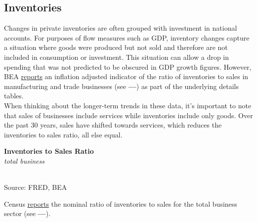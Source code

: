 \documentclass{report}
\makeatletter
\newcommand{\tbllink}[1]{\href{https://raw.githubusercontent.com/bdecon/US-chartbook/master/chartbook/data/#1}{\faTable}}
\newcommand*\short[1]{\expandafter\@gobbletwo\number\numexpr#1\relax}
\newcommand{\shdateaxisticks}{
		date coordinates in=x, axis line style={draw=none},
		xmax={2021-02-01},
		max space between ticks=40,	    
		xtick={{1990-01-01}, {1995-01-01}, {2000-01-01}, 
			{2005-01-01}, {2010-01-01}, {2015-01-01}, {2020-01-01}},
		minor xtick={},
		enlarge y limits={0.06}, enlarge x limits={0.01},
		}
\newcommand{\stdline}[4]{\addplot[very thick, no markers, color=#1] 
		table [x=#2, y=#3, col sep=comma] {#4};	}
\newcommand{\rbars}{
		\fill[color=black!10] (axis cs:{1990-07-01},\pgfkeysvalueof{/pgfplots/ymin}) rectangle 
			(axis cs:{1991-03-01}, \pgfkeysvalueof{/pgfplots/ymax});
		\fill[color=black!10] (axis cs:{2007-12-01},\pgfkeysvalueof{/pgfplots/ymin}) rectangle 
			(axis cs:{2009-07-01}, \pgfkeysvalueof{/pgfplots/ymax});
		\fill[color=black!10] (axis cs:{2001-03-01},\pgfkeysvalueof{/pgfplots/ymin}) rectangle 
			(axis cs:{2001-11-01}, \pgfkeysvalueof{/pgfplots/ymax});}
\makeatother
\begin{document}
{{{{{{\vspace{12mm}

\subsection*{\color{black!70} \seriffont Inventories}
\begin{minipage}{0.76\textwidth}
\small Changes in private inventories are often grouped with investment in national accounts. For purposes of flow measures such as GDP, inventory changes capture a situation where goods were produced but not sold and therefore are not included in consumption or investment. This situation can allow a drop in spending that was not predicted to be obscured in GDP growth figures. However, BEA \href{https://apps.bea.gov/iTable/index_UD.cfm}{reports} an inflation adjusted indicator of the ratio of inventories to sales in manufacturing and trade businesses (see {\color{blue!60!green}\textbf{---}}) as part of the underlying details tables. \\

When thinking about the longer-term trends in these data, it's important to note that sales of businesses include services while inventories include only goods. Over the past 30 years, sales have shifted towards services, which reduces the inventories to sales ratio, all else equal. 

\end{minipage}
\vspace{1mm}

\begin{minipage}{0.4\textwidth}
\noindent \normalsize \textbf{Inventories to Sales Ratio}\\
\footnotesize{\textit{total business}}\\ 
\noindent \hspace*{-2mm} \\
\footnotesize{Source: FRED, BEA} \hfill \tbllink{isratio.csv}\\
\end{minipage} \hspace{8mm}
\begin{minipage}{0.31\textwidth}
\small Census \href{https://www.census.gov/mtis/www/data/pdf/mtis_current.pdf}{reports} the nominal ratio of inventories to sales for the total business sector (see {\color{blue!40!cyan!80!white}\textbf{---}}). 
\end{minipage}



}}}}}}
\end{document}
